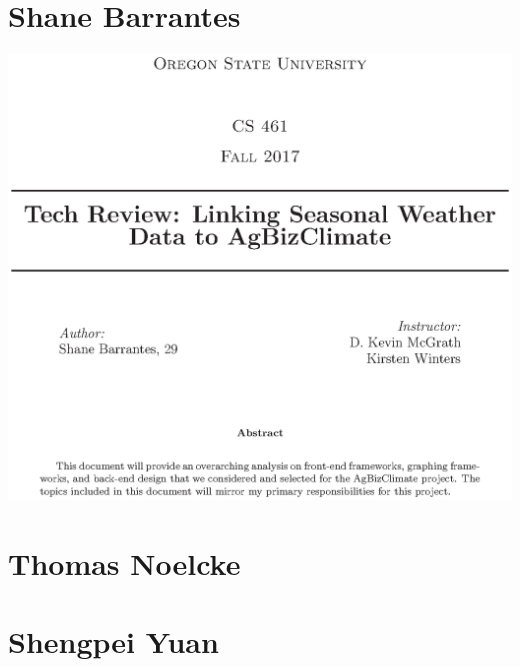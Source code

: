 \documentclass[onecolumn, draftclsnofoot,10pt, compsoc]{article}
\begin{document}
		\section{Shane Barrantes}
			\includegraphics{Shane/main.ps}
		
		\section{Thomas Noelcke}
			
		\section{Shengpei Yuan}
			
\end{document}
